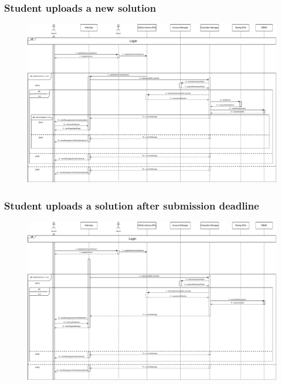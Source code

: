 \documentclass{article}
\begin{document}
{    \subsubsection{Student uploads a new solution}
        \begin{figure}[H]
            \centering
            \hspace*{-3.6cm}\includegraphics[scale=0.5]{Sequence/Sequence11DD.pdf}
            \caption{}
            \label{fig:Sequence11DD}
        \end{figure}
    \subsubsection{Student uploads a solution after submission deadline}
        \begin{figure}[H]
            \centering
            \hspace*{-3.3cm}\includegraphics[scale=0.5]{Sequence/Sequence12DD.pdf}
            \caption{}
            \label{fig:Sequence12DD}
        \end{figure}
}
\end{document}
